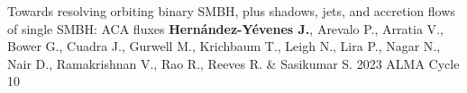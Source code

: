 
\begin{cvpublications}{}

	 {Towards resolving orbiting binary SMBH, plus shadows, jets, and accretion flows of single SMBH: ACA fluxes}
	 {\textbf{Hernández-Yévenes J.}, Arevalo P., Arratia V., Bower G., Cuadra J., Gurwell M., Krichbaum T., Leigh N., Lira P., Nagar N., Nair D., Ramakrishnan V., Rao R., Reeves R. \& Sasikumar S.}
	 {2023}
     {ALMA Cycle 10}
     {}

\end{cvpublications}